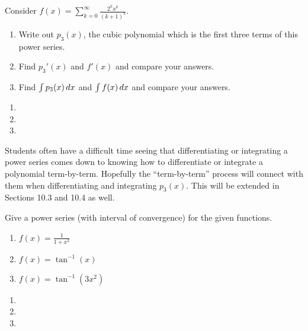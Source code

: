\documentclass[]{ximera}
\begin{document}
\begin{problem}
Consider $f(x) = \sum_{k=0}^\infty \frac{2^k x^k}{(k+1)^3}$.
	\begin{enumerate}
	\item  Write out $p_3(x)$, the cubic polynomial which is the first three terms of this power series.
	
	\item  Find $p_3'(x)$ and $f'(x)$ and compare your answers.
	
	\item  Find $\int p_3(x) \,d x$ and $\int f(x) \,d x$ and compare your answers.
	\end{enumerate}
	
	\begin{freeResponse}
	\begin{enumerate}
	\item
	
	\item
	
	\item
	\end{enumerate}
	\end{freeResponse}

\end{problem}

\begin{instructorNotes}
Students often have a difficult time seeing that differentiating or integrating a power series comes down to knowing how to differentiate or integrate a polynomial term-by-term.  
Hopefully the ``term-by-term'' process will connect with them when differentiating and integrating $p_3(x)$.  
This will be extended in Sections 10.3 and 10.4 as well.
\end{instructorNotes}







\begin{problem}
Give a power series (with interval of convergence) for the given functions.
	\begin{multicols}{3}
	\begin{enumerate}
	\item  $f(x) = \frac{1}{1+x^2}$
	\item  $f(x) = \tan^{-1}(x)$
	\item  $f(x) = \tan^{-1}(3x^2)$
	\end{enumerate}
	\end{multicols}
	
	\begin{freeResponse}
	\begin{enumerate}
	\item
	
	\item
	
	\item
	\end{enumerate}
	\end{freeResponse}

\end{problem}
\end{document}
